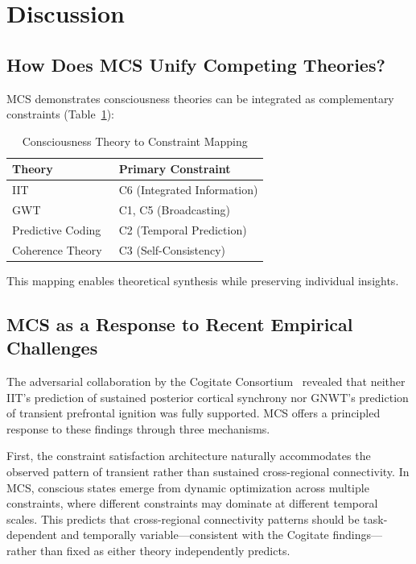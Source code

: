 \documentclass[10pt,journal,compsoc]{IEEEtran}
\begin{document}
\section{Discussion}
\label{sec:discussion}

\subsection{How Does MCS Unify Competing Theories?}

MCS demonstrates consciousness theories can be integrated as complementary constraints (Table~\ref{tab:theory_mapping}):

\begin{table}[!t]
\renewcommand{\arraystretch}{1.3}
\caption{Consciousness Theory to Constraint Mapping}
\label{tab:theory_mapping}
\centering
\begin{tabular}{ll}
\toprule
\textbf{Theory} & \textbf{Primary Constraint} \\
\midrule
IIT~\cite{tononi2004,tononi2008,tononi2016} & C6 (Integrated Information) \\
GWT~\cite{baars2005,dehaene2014} & C1, C5 (Broadcasting) \\
Predictive Coding~\cite{friston2010} & C2 (Temporal Prediction) \\
Coherence Theory~\cite{thagard1998} & C3 (Self-Consistency) \\
\bottomrule
\end{tabular}
\end{table}

This mapping enables theoretical synthesis while preserving individual insights.

\subsection{MCS as a Response to Recent Empirical Challenges}

The adversarial collaboration by the Cogitate Consortium~\cite{Melloni2025} revealed that neither IIT's prediction of sustained posterior cortical synchrony nor GNWT's prediction of transient prefrontal ignition was fully supported. MCS offers a principled response to these findings through three mechanisms.

First, the constraint satisfaction architecture naturally accommodates the observed pattern of transient rather than sustained cross-regional connectivity. In MCS, conscious states emerge from dynamic optimization across multiple constraints, where different constraints may dominate at different temporal scales. This predicts that cross-regional connectivity patterns should be task-dependent and temporally variable—consistent with the Cogitate findings—rather than fixed as either theory independently predicts.
\end{document}
